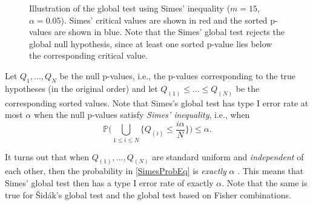 \documentclass[11pt]{article}
\theoremstyle{plain}
\theoremstyle{definition}
\newcommand{\pr}{\mathbb{P}}
\newcommand{\citp}{\citep}
\begin{document}
\begin{figure}[ht!] 
\centering
{}
\caption{Illustration of the global test using Simes' inequality ($m=15$, $\alpha=0.05$). Simes' critical values are shown in red and the sorted p-values are shown in blue. Note that the Simes' global test rejects the global null hypothesis, since at least one sorted p-value lies below the corresponding critical value.}  \label{FigSimes}
\end{figure} 


Let  $Q_{1},..., Q_{N}$ be the null p-values, i.e., the  p-values corresponding to the true hypotheses (in the original order) and let $Q_{(1)}\leq...\leq Q_{(N)}$ be the corresponding sorted values.
Note that Simes's global test  has type I error rate at most $\alpha$ when the null p-values satisfy \emph{Simes' inequality}, i.e., when 
\begin{equation}  \label{SimesProbEq}
\pr \big( \bigcup_{1 \leq i \leq N} \{Q_{(i)}\leq \frac{i\alpha}{N} \}\big)\leq \alpha.
\end{equation}


It turns out that when $Q_{(1)},...,Q_{(N)}$ are standard uniform and \emph{independent} of each other, then the probability in \eqref{SimesProbEq} is \emph{exactly} $\alpha$ \citp{sarkar1998some}. This means that Simes' global test then has a type I error rate of exactly $\alpha$. Note that the same is true for \v{S}id\'{a}k's global test and the global test based on Fisher combinations.
\end{document}
